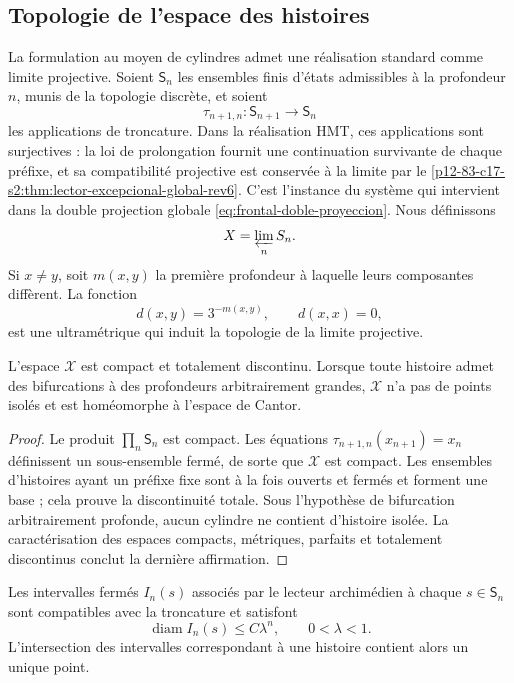 \subsection{Topologie de l'espace des histoires}

La formulation au moyen de cylindres admet une réalisation standard comme
limite projective. Soient \(\mathsf S_n\) les ensembles finis d'états
admissibles à la profondeur \(n\), munis de la topologie discrète, et soient
\[
 \tau_{n+1,n}:\mathsf S_{n+1}\longrightarrow\mathsf S_n
\]
les applications de troncature. Dans la réalisation HMT, ces applications
sont surjectives : la loi de prolongation fournit une continuation
survivante de chaque préfixe, et sa compatibilité projective est conservée à
la limite par le
\cref{p12-83-c17-s2:thm:lector-excepcional-global-rev6}. C'est l'instance
du système qui intervient dans la double projection globale
\eqref{eq:frontal-doble-proyeccion}. Nous définissons
\[
 \mathcal X=\varprojlim_n\mathsf S_n.
\]
Si \(x\ne y\), soit \(m(x,y)\) la première profondeur à laquelle leurs
composantes diffèrent. La fonction
\[
 d(x,y)=3^{-m(x,y)},\qquad d(x,x)=0,
\]
est une ultramétrique qui induit la topologie de la limite projective.

\begin{theorem}
\label{p12-83-c17-s1:thm:compacto-historias}
\label{thm:compacto-historias}
L'espace \(\mathcal X\) est compact et totalement discontinu. Lorsque
toute histoire admet des bifurcations à des profondeurs arbitrairement grandes,
\(\mathcal X\) n'a pas de points isolés et est homéomorphe à l'espace de
Cantor.
\end{theorem}

\begin{proof}
Le produit \(\prod_n\mathsf S_n\) est compact. Les équations
\(\tau_{n+1,n}(x_{n+1})=x_n\) définissent un sous-ensemble fermé, de sorte que
\(\mathcal X\) est compact. Les ensembles d'histoires ayant un préfixe fixe
sont à la fois ouverts et fermés et forment une base ; cela prouve la
discontinuité totale. Sous l'hypothèse de bifurcation arbitrairement profonde,
aucun cylindre ne contient d'histoire isolée. La caractérisation des
espaces compacts, métriques, parfaits et totalement discontinus conclut
la dernière affirmation.
\end{proof}

Les intervalles fermés \(I_n(s)\) associés par le lecteur archimédien à
chaque \(s\in\mathsf S_n\) sont compatibles avec la troncature et satisfont
\[
 \operatorname{diam}I_n(s)\leq C\lambda^n,
 \qquad 0<\lambda<1.
\]
L'intersection des intervalles correspondant à une histoire contient
alors un unique point.


